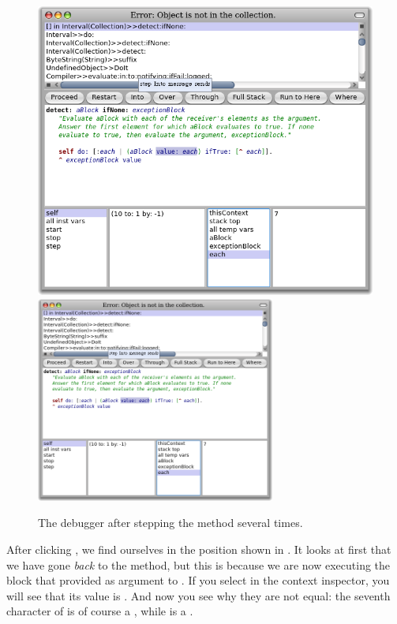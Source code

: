 \documentclass[a4paper,10pt,twoside]{book}
\begin{document}
\begin{figure}[btp]
	\begin{center}
	\ifluluelse
		{\includegraphics[width=\textwidth]{steppingIntoValue}}
		{\includegraphics[width=0.7\textwidth]{steppingIntoValue}}
	\end{center}
	\caption{The debugger after stepping  the  method several times.}
\end{figure}

After clicking , we find ourselves in the position shown in .
It looks at first that we have gone \emph{back} to the  method, but this is because we are now executing the block that  provided as argument to .
If you select  in the context inspector, you will see that its value is .
And now you see why they are not equal: the seventh character of  is of course a , while  is a .
\end{document}
